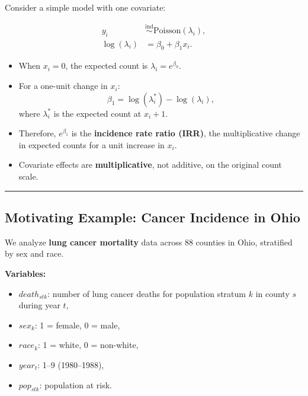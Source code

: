 \documentclass[
  letterpaper,
  DIV=11,
  numbers=noendperiod]{scrreprt}
\providecommand{\tightlist}{%
  \setlength{\itemsep}{0pt}\setlength{\parskip}{0pt}}\usepackage{longtable,booktabs,array}
\begin{document}
Consider a simple model with one covariate:

\[
\begin{aligned}
y_i &\overset{\text{ind}}{\sim} \text{Poisson}(\lambda_i), \\
\log(\lambda_i) &= \beta_0 + \beta_1 x_i.
\end{aligned}
\]

\begin{itemize}
\tightlist
\item
  When \(x_i = 0\), the expected count is \(\lambda_i = e^{\beta_0}\).
\item
  For a one-unit change in \(x_i\): \[
  \beta_1 = \log(\lambda_i^*) - \log(\lambda_i),
  \] where \(\lambda_i^*\) is the expected count at \(x_i + 1\).
\item
  Therefore, \(e^{\beta_1}\) is the \textbf{incidence rate ratio (IRR)},
  the multiplicative change in expected counts for a unit increase in
  \(x_i\).
\item
  Covariate effects are \textbf{multiplicative}, not additive, on the
  original count scale.
\end{itemize}

\begin{center}\rule{0.5\linewidth}{0.5pt}\end{center}

\hypertarget{motivating-example-cancer-incidence-in-ohio}{%
\subsection*{Motivating Example: Cancer Incidence in
Ohio}\label{motivating-example-cancer-incidence-in-ohio}}

We analyze \textbf{lung cancer mortality} data across 88 counties in
Ohio, stratified by sex and race.

\textbf{Variables:}

\begin{itemize}
\tightlist
\item
  \(death_{stk}\): number of lung cancer deaths for population stratum
  \(k\) in county \(s\) during year \(t\),
\item
  \(sex_k\): 1 = female, 0 = male,
\item
  \(race_k\): 1 = white, 0 = non-white,
\item
  \(year_t\): 1--9 (1980--1988),
\item
  \(pop_{stk}\): population at risk.
\end{itemize}
\end{document}
